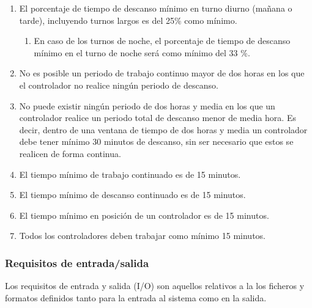 \begin{enumerate}[resume*]
	
	\item \label{RD:porcentaje-min-descanso} El porcentaje de tiempo de descanso mínimo en turno diurno (mañana o tarde), incluyendo turnos largos es del 25\% como mínimo.
	\begin{enumerate}[label*={\textbf{.\arabic*}}]
		\item En caso de los turnos de noche, el porcentaje de tiempo de descanso mínimo en el turno de noche será
	como mínimo del 33 \%.
	\end{enumerate}
	
	\item No es posible un periodo de trabajo continuo mayor de dos horas en los que el controlador no realice ningún periodo de descanso.
	
	\item No puede existir ningún periodo de dos horas y media en los que un controlador realice un periodo total de descanso menor de media hora. Es decir, dentro de una ventana de tiempo de dos horas y media un controlador debe tener mínimo 30 minutos de descanso, sin ser necesario que estos se realicen de forma continua.
	
	\item El tiempo mínimo de trabajo continuado es de 15 minutos.
	
	\item El tiempo mínimo de descanso continuado es de 15 minutos.
	
	\item El tiempo mínimo en posición de un controlador es de 15 minutos.
	
	\item Todos los controladores deben trabajar como mínimo 15 minutos.
		
\end{enumerate}


\subsubsection{Requisitos de entrada/salida}
Los requisitos de entrada y salida (I/O) son aquellos relativos a la los ficheros y formatos definidos tanto para la entrada al sistema como en la salida.


